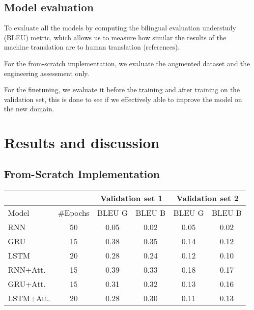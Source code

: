 \subsection{Model evaluation}
To evaluate all the models by computing the bilingual evaluation understudy (BLEU) metric, which allows us to measure how similar the results of the machine translation are to human translation (references).

For the from-scratch implementation, we evaluate the augmented dataset and the engineering assessment only. 

For the finetuning, we evaluate it before the training and after training on the validation set, this is done to see if we effectively able to improve the model on the new domain.



\section{Results and discussion}
\subsection{From-Scratch Implementation}
\begin{table}[H]
	\centering
	\begin{tabular}{@{}lccccc@{}}
	\cmidrule(l){3-6}
	\multicolumn{2}{l}{} & \multicolumn{2}{c}{Validation set 1} & \multicolumn{2}{c}{Validation set 2} \\ \midrule
	Model     & \#Epochs & BLEU G          & BLEU B         & BLEU G          & BLEU B         \\ \midrule
	RNN       & 50       & 0.05              & 0.02             & 0.05              & 0.02             \\
	GRU       & 15       & 0.38              & 0.35             & 0.14              & 0.12             \\
	LSTM      & 20       & 0.28              & 0.24             & 0.12              & 0.10             \\
	RNN+Att.  & 15       & 0.39              & 0.33             & 0.18              & 0.17             \\
	GRU+Att.  & 15       & 0.31              & 0.32             & 0.13              & 0.16             \\
	LSTM+Att. & 20       & 0.28              & 0.30             & 0.11              & 0.13             \\ \bottomrule
	\end{tabular}
	\end{table}

